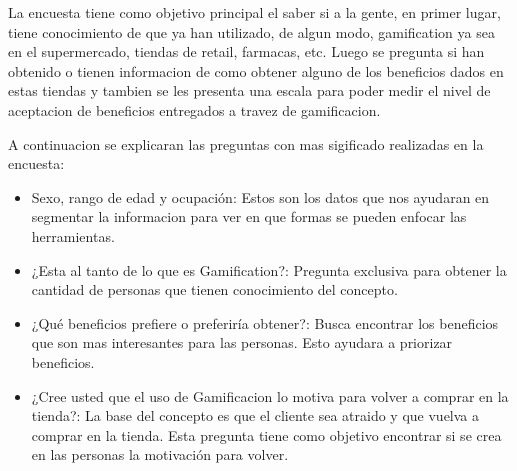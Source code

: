 La encuesta tiene como objetivo principal el saber si a la gente, en primer lugar, tiene conocimiento
de que ya han utilizado, de algun modo, gamification ya sea en el supermercado, tiendas de retail, 
farmacas, etc. Luego se pregunta si han obtenido o tienen informacion de como obtener alguno 
de los beneficios dados en estas tiendas y tambien se les presenta una escala para poder medir 
el nivel de aceptacion de beneficios entregados a travez de gamificacion.

A continuacion se explicaran las preguntas con mas sigificado realizadas en la encuesta:
\begin{itemize}
\item Sexo, rango de edad y ocupación: Estos son los datos que nos ayudaran en segmentar
la informacion para ver en que formas se pueden enfocar las herramientas.
\item ¿Esta al tanto de lo que es Gamification?: Pregunta exclusiva para obtener la cantidad de
personas que tienen conocimiento del concepto.
\item ¿Qué beneficios prefiere o preferiría obtener?: Busca encontrar los beneficios que son
 mas interesantes para las personas. Esto ayudara a priorizar beneficios.
\item ¿Cree usted que el uso de Gamificacion lo motiva para volver a comprar en la tienda?: La 
base del concepto es que el cliente sea atraido y que vuelva a comprar en la tienda. Esta pregunta
tiene como objetivo encontrar si se crea en las personas la motivación para volver.
\end{itemize}

